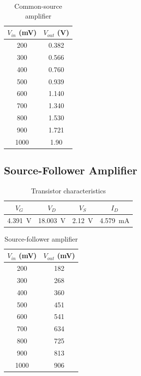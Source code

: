 \begin{table}[hbtp]
  \centering
  \begin{tabular}{cc}
    $V_{in}$ (\si{mV}) & $V_{out}$ (\si{V}) \\
    \hline
    200          & 0.382         \\
    300          & 0.566         \\
    400          & 0.760         \\
    500          & 0.939         \\
    600          & 1.140         \\
    700          & 1.340         \\
    800          & 1.530         \\
    900          & 1.721         \\
    1000         & 1.90          \\
  \end{tabular}
  \caption{\label{tab:common-source} Common-source amplifier}
\end{table}

\subsection{Source-Follower Amplifier}

\begin{table}[hbtp]
  \centering
  \begin{tabular}{cccc}
    $V_G$ & $V_D$ & $V_S$ & $I_D$ \\
    \hline
    \SI{4.391}{V} & \SI{18.003}{V} & \SI{2.12}{V} & \SI{4.579}{mA} \\
  \end{tabular}
  \caption{\label{tab:tran_follower} Transistor characteristics}
\end{table}

\begin{table}[hbtp]
  \centering
  \begin{tabular}{cc}
    $V_{in}$ (\si{mV}) & $V_{out}$ (\si{mV}) \\
    \hline
    200                & 182                 \\
    300                & 268                 \\
    400                & 360                 \\
    500                & 451                 \\
    600                & 541                 \\
    700                & 634                 \\
    800                & 725                 \\
    900                & 813                 \\
    1000               & 906                 \\
  \end{tabular}
  \caption{\label{tab:source-follower} Source-follower amplifier}
\end{table}

